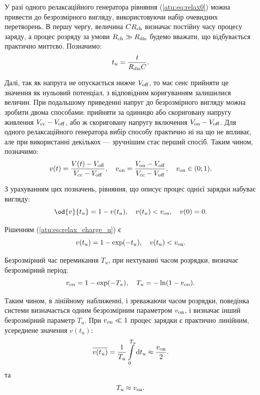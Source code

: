 У разі одного релаксаційного генератора рівняння (\ref{atu:eq:relax0})
можна привести до безрозмірного вигляду, використовуючи набір
очевидних перетворень. В першу чергу, величина
$ C R _\mathrm{ch} $ визначає постійну часу процесу заряду, а процес
розряду за умови
$ R _\mathrm{ch} \gg R _\mathrm{dis} $ будемо вважати, що відбувається практично
миттєво. Позначимо:
%
\begin{equation}
  t_u = \frac{t}{R_\mathrm{dis} C} .
  \label{atu:eq:t_u_relax}
\end{equation}

Далі, так як напруга не опускається нижче
$ V _\mathrm{off} $, то має сенс прийняти це значення як нульовий потенціал,
з відповідним коригуванням залишилися величин. При подальшому
приведенні напруг до безрозмірного вигляду можна зробити двома
способами: прийняти за одиницю або скориговану напругу живлення
$ V _\mathrm{cc} -V _\mathrm{off} $, або ж скориговану напругу включення
$ V _\mathrm{on} -V _\mathrm{off} $. Для одного релаксаційного генератора вибір
способу практично ні на що не впливає, але при використанні
декількох --- зручнішим стає перший спосіб. Таким чином,
позначимо:
%
\begin{equation}
  v(t) = \frac{V(t)-V_\mathrm{off}}{V_\mathrm{cc}-V_\mathrm{off}},
  \quad
  v_\mathrm{on} = \frac{V_\mathrm{on}-V_\mathrm{off}}{V_\mathrm{cc}-V_\mathrm{off}},
  \quad
  v_\mathrm{on} \in ( 0; 1 ).
  \label{atu:eq:v_u_relax}
\end{equation}

З урахуванням цих позначень, рівняння, що описує процес однієї
зарядки набуває вигляду:
%
\begin{equation}
  \od{v}{t_u} = 1 - v( t_u ),
  \quad
  v( t_u ) < v\Tidx{on},
  \quad
  v(0) = 0.
  \label{atu:eq:relax_charge_u}
\end{equation}

Рішенням (\ref{atu:eq:relax_charge_u}) є
%
\begin{equation}
  v(t_u) = 1 - \exp( - t_u ) ,
  \quad
  v( t_u ) < v_\mathrm{on}.
  \label{atu:eq:relax_charge_u_solu}
\end{equation}

Безрозмірний час перемикання
$ T_u $, при нехтуванні часом розрядки, визначає безрозмірний
період:
%
\begin{equation}
  v_\mathrm{on} = 1 - \exp( - T_u ),
  \quad
  T_u = - \ln ( 1 - v_\mathrm{on} ).
  \label{atu:eq:T_u_relax}
\end{equation}

Таким чином, в лінійному наближенні, і зреважаючи часом
розрядки, поведінка системи визначається одним безрозмірним
параметром
$ v _\mathrm{on} $, і визначає інший безрозмірний параметр
$ T_u $. При
$ v _\mathrm{on} \ll 1 $ процес зарядки є практично линійним, усереднене значення
$ v (t_u) $:
%
\begin{equation}
  \overline{v(t_u)} =
  \frac{1}{T_u}\int\limits_{0}^{T_u} \mathrm{d}t_u
  \approx
  \frac{v_\mathrm{on}}{ 2 }.
  \label{atu:eq:av_lin_relax}
\end{equation}
%
та
%
\begin{equation}
  T_u
  \approx
  v_\mathrm{on}.
  \label{atu:eq:T_u_lin_relax}
\end{equation}

